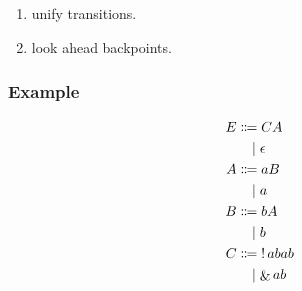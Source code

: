 \begin{enumerate}
  \item unify transitions.
  \item look ahead backpoints.
\end{enumerate}

\subsubsection{Example}

\begin{align*}
  E
  &\BNFassign C A \\
  &\BNFor \epsilon \\
  A
  &\BNFassign a B \\
  &\BNFor a \\
  B
  &\BNFassign b A \\
  &\BNFor b \\
  C
  &\BNFassign \mathop{!} abab \\
  &\BNFor \mathop{\&} ab
\end{align*}

